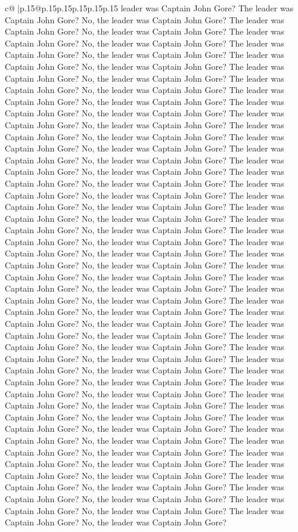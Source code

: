 \documentclass{article}
\begin{document}
{\begin{supertabular}{c@{$\;$}|p{.15\linewidth}@{}p{.15\linewidth}p{.15\linewidth}p{.15\linewidth}p{.15\linewidth}p{.15\linewidth}}
{{{leader was Captain John Gore? The leader was Captain John Gore? No, the leader was Captain John Gore? The leader was Captain John Gore? No, the leader was Captain John Gore? The leader was Captain John Gore? No, the leader was Captain John Gore? The leader was Captain John Gore? No, the leader was Captain John Gore? The leader was Captain John Gore? No, the leader was Captain John Gore? The leader was Captain John Gore? No, the leader was Captain John Gore? The leader was Captain John Gore? No, the leader was Captain John Gore? The leader was Captain John Gore? No, the leader was Captain John Gore? The leader was Captain John Gore? No, the leader was Captain John Gore? The leader was Captain John Gore? No, the leader was Captain John Gore? The leader was Captain John Gore? No, the leader was Captain John Gore? The leader was Captain John Gore? No, the leader was Captain John Gore? The leader was Captain John Gore? No, the leader was Captain John Gore? The leader was Captain John Gore? No, the leader was Captain John Gore? The leader was Captain John Gore? No, the leader was Captain John Gore? The leader was Captain John Gore? No, the leader was Captain John Gore? The leader was Captain John Gore? No, the leader was Captain John Gore? The leader was Captain John Gore? No, the leader was Captain John Gore? The leader was Captain John Gore? No, the leader was Captain John Gore? The leader was Captain John Gore? No, the leader was Captain John Gore? The leader was Captain John Gore? No, the leader was Captain John Gore? The leader was Captain John Gore? No, the leader was Captain John Gore? The leader was Captain John Gore? No, the leader was Captain John Gore? The leader was Captain John Gore? No, the leader was Captain John Gore? The leader was Captain John Gore? No, the leader was Captain John Gore? The leader was Captain John Gore? No, the leader was Captain John Gore? The leader was Captain John Gore? No, the leader was Captain John Gore? The leader was Captain John Gore? No, the leader was Captain John Gore? The leader was Captain John Gore? No, the leader was Captain John Gore? The leader was Captain John Gore? No, the leader was Captain John Gore? The leader was Captain John Gore? No, the leader was Captain John Gore? The leader was Captain John Gore? No, the leader was Captain John Gore? The leader was Captain John Gore? No, the leader was Captain John Gore? The leader was Captain John Gore? No, the leader was Captain John Gore? The leader was Captain John Gore? No, the leader was Captain John Gore? The leader was Captain John Gore? No, the leader was Captain John Gore? The leader was Captain John Gore? No, the leader was Captain John Gore? The leader was Captain John Gore? No, the leader was Captain John Gore? The leader was Captain John Gore? No, the leader was Captain John Gore? The leader was Captain John Gore? No, the leader was Captain John Gore? The leader was Captain John Gore? No, the leader was Captain John Gore? The leader was Captain John Gore? No, the leader was Captain John Gore? The leader was Captain John Gore? No, the leader was Captain John Gore? The leader was Captain John Gore? No, the leader was Captain John Gore? }}}
\end{supertabular}}
\end{document}
